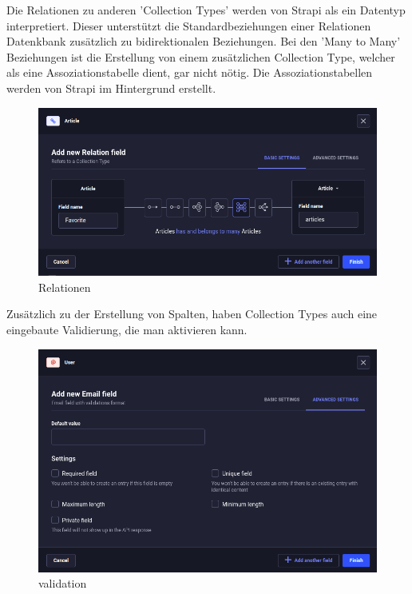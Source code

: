 Die Relationen zu anderen 'Collection Types' werden von Strapi als ein Datentyp interpretiert.
Dieser unterstützt die Standardbeziehungen einer Relationen Datenkbank zusätzlich zu bidirektionalen Beziehungen.
Bei den 'Many to Many' Beziehungen ist die Erstellung von einem zusätzlichen Collection Type, welcher als eine Assoziationstabelle dient, gar nicht nötig.
Die Assoziationstabellen werden von Strapi im Hintergrund erstellt.

\begin{figure}[H]
    \centering
    \includegraphics[width=\textwidth]{./pics/relations}
    \caption{Relationen}
    \label{relations}
\end{figure}


Zusätzlich zu der Erstellung von Spalten, haben Collection Types auch eine eingebaute Validierung, die man aktivieren kann.
\begin{figure}[H]
    \centering
    \includegraphics[width=\textwidth]{./pics/validation.png}
    \caption{validation}
    \label{validation}

\end{figure}

